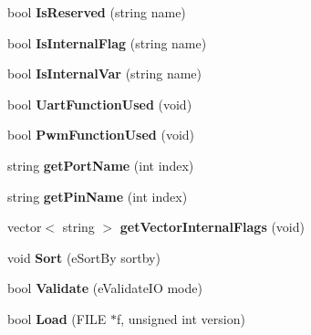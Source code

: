 \begin{DoxyCompactItemize}
\item 
\hypertarget{classmap_i_o_ad92f78193b5ab77ca39e92b72a398ac8}{bool {\bfseries Is\-Reserved} (string name)}\label{classmap_i_o_ad92f78193b5ab77ca39e92b72a398ac8}

\item 
\hypertarget{classmap_i_o_ab375ff696e5c43268b43a83071832e34}{bool {\bfseries Is\-Internal\-Flag} (string name)}\label{classmap_i_o_ab375ff696e5c43268b43a83071832e34}

\item 
\hypertarget{classmap_i_o_a9c99486b9654394ba723477edf6ec4da}{bool {\bfseries Is\-Internal\-Var} (string name)}\label{classmap_i_o_a9c99486b9654394ba723477edf6ec4da}

\item 
\hypertarget{classmap_i_o_a04aa188d6ca1f0d1ca14f939313fb0f3}{bool {\bfseries Uart\-Function\-Used} (void)}\label{classmap_i_o_a04aa188d6ca1f0d1ca14f939313fb0f3}

\item 
\hypertarget{classmap_i_o_ae5d75f9ec8ddec323a7ed1d6d05f599b}{bool {\bfseries Pwm\-Function\-Used} (void)}\label{classmap_i_o_ae5d75f9ec8ddec323a7ed1d6d05f599b}

\item 
\hypertarget{classmap_i_o_a42fd2e0011163a4819da7a98da044898}{string {\bfseries get\-Port\-Name} (int index)}\label{classmap_i_o_a42fd2e0011163a4819da7a98da044898}

\item 
\hypertarget{classmap_i_o_addb63523b91f6d779e4ceb7f4de69093}{string {\bfseries get\-Pin\-Name} (int index)}\label{classmap_i_o_addb63523b91f6d779e4ceb7f4de69093}

\item 
\hypertarget{classmap_i_o_a0009c714ac25cac590d3c8c40cb454a6}{vector$<$ string $>$ {\bfseries get\-Vector\-Internal\-Flags} (void)}\label{classmap_i_o_a0009c714ac25cac590d3c8c40cb454a6}

\item 
\hypertarget{classmap_i_o_aeae609592891208add34650972c7d768}{void {\bfseries Sort} (e\-Sort\-By sortby)}\label{classmap_i_o_aeae609592891208add34650972c7d768}

\item 
\hypertarget{classmap_i_o_a9ed76d514b2680c4c5ae38487b6ca74c}{bool {\bfseries Validate} (e\-Validate\-I\-O mode)}\label{classmap_i_o_a9ed76d514b2680c4c5ae38487b6ca74c}

\item 
\hypertarget{classmap_i_o_a7cea65146f19d3eaa0bf762455fd480f}{bool {\bfseries Load} (F\-I\-L\-E $\ast$f, unsigned int version)}\label{classmap_i_o_a7cea65146f19d3eaa0bf762455fd480f}


\end{DoxyCompactItemize}
